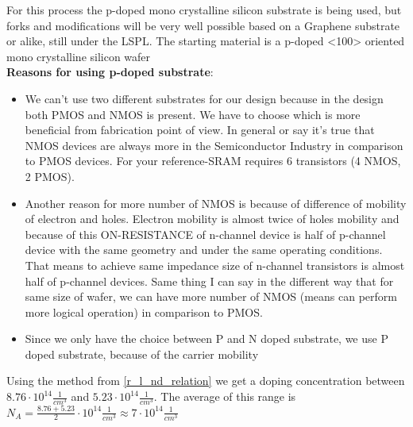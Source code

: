 For this process the p-doped mono crystalline silicon substrate is being used, but forks and modifications will be very well possible based on a Graphene substrate or alike, still under the LSPL.
The starting material is a p-doped <100> oriented mono crystalline silicon wafer\\

\textbf{Reasons for using p-doped substrate}:\begin{itemize}
\item We can't use two different substrates for our design because in the design both PMOS and NMOS is present.
We have to choose which is more beneficial from fabrication point of view.
In general or say it's true that NMOS devices are always more in the Semiconductor Industry in comparison to PMOS devices.
For your reference-SRAM requires 6 transistors (4 NMOS, 2 PMOS).
\item Another reason for more number of NMOS is because of difference of mobility of electron and holes.
Electron mobility is almost twice of holes mobility and because of this ON-RESISTANCE of n-channel device is half of p-channel device with the same geometry and under the same operating conditions.
That means to achieve same impedance size of n-channel transistors is almost half of p-channel devices.
Same thing I can say in the different way that for same size of wafer, we can have more number of NMOS (means can perform more logical operation) in comparison to PMOS.
\item Since we only have the choice between P and N doped substrate, we use P doped substrate, because of the carrier mobility
\end{itemize}

Using the method from \autoref{r_l_nd_relation} we get a doping concentration between $8.76 \cdot 10^{14} \frac{1}{cm^3}$ and $5.23 \cdot 10^{14} \frac{1}{cm^3}$.
The average of this range is $N_A = \frac{8.76+5.23 }{2} \cdot 10^{14} \frac{1}{cm^3} \approx 7 \cdot 10^{14} \frac{1}{cm^3}$